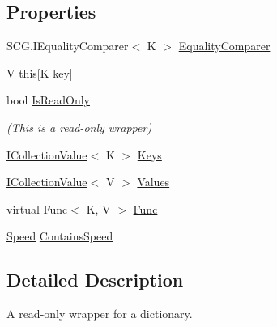 \subsection*{Properties}
\begin{DoxyCompactItemize}
\item 
S\+C\+G.\+I\+Equality\+Comparer$<$ K $>$ \hyperlink{class_c5_1_1_guarded_dictionary_aa92bdc349fb14d43d5ead652ec07e3fa}{Equality\+Comparer}
\item 
V \hyperlink{class_c5_1_1_guarded_dictionary_a721d36a134e3aa6ff2c92cf6bffb9fb3}{this\mbox{[}\+K key\mbox{]}}
\item 
bool \hyperlink{class_c5_1_1_guarded_dictionary_a18ce63220c7b6b3e6a569cd321c4da16}{Is\+Read\+Only}
\begin{DoxyCompactList}\small\item\em (This is a read-\/only wrapper) \end{DoxyCompactList}\item 
\hyperlink{interface_c5_1_1_i_collection_value}{I\+Collection\+Value}$<$ K $>$ \hyperlink{class_c5_1_1_guarded_dictionary_a9ebe83dbe1e0e8c93c7d268c3643fba4}{Keys}
\item 
\hyperlink{interface_c5_1_1_i_collection_value}{I\+Collection\+Value}$<$ V $>$ \hyperlink{class_c5_1_1_guarded_dictionary_ab5aef218f548d9a8abb97ff033be4173}{Values}
\item 
virtual Func$<$ K, V $>$ \hyperlink{class_c5_1_1_guarded_dictionary_a0dc7a885f47a6a2506e46fb813190231}{Func}
\item 
\hyperlink{namespace_c5_a615ba88dcdaa8d5a3c5f833a73d7fad6}{Speed} \hyperlink{class_c5_1_1_guarded_dictionary_a4926964829c05063b557c42f6ed6f9e1}{Contains\+Speed}
\end{DoxyCompactItemize}


\subsection{Detailed Description}
A read-\/only wrapper for a dictionary. 

